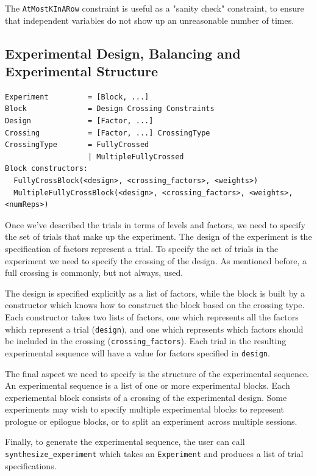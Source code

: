 The \texttt{AtMostKInARow} constraint is useful as a "sanity check" constraint, to ensure that independent variables do not show up an unreasonable number of times.

\subsection{Experimental Design, Balancing and Experimental Structure}

\begin{verbatim}
Experiment         = [Block, ...]
Block              = Design Crossing Constraints
Design             = [Factor, ...]
Crossing           = [Factor, ...] CrossingType
CrossingType       = FullyCrossed
                   | MultipleFullyCrossed
Block constructors:
  FullyCrossBlock(<design>, <crossing_factors>, <weights>)
  MultipleFullyCrossBlock(<design>, <crossing_factors>, <weights>, <numReps>)
\end{verbatim}

Once we've described the trials in terms of levels and factors, we need to specify the set of trials that make up the experiment. The design of the experiment is the specification of factors represent a trial. To specify the set of trials in the experiment we need to specify the crossing of the design. As mentioned before, a full crossing is commonly, but not always, used.

The design is specified explicitly as a list of factors, while the block is built by a constructor which knows how to construct the block based on the crossing type. Each constructor takes two lists of factors, one which represents all the factors which represent a trial (\texttt{design}), and one which represents which factors should be included in the crossing (\texttt{crossing\_factors}). Each trial in the resulting experimental sequence will have a value for factors specified in \texttt{design}.

The final aspect we need to specify is the structure of the experimental sequence. An experimental sequence is a list of one or more experimental blocks. Each experiemental block consists of a crossing of the experimental design. Some experiments may wish to specify multiple experimental blocks to represent prologue or epilogue blocks, or to split an experiment across multiple sessions.

Finally, to generate the experimental sequence, the user can call \texttt{synthesize\_experiment} which takes an \texttt{Experiment} and produces a list of trial specifications.

